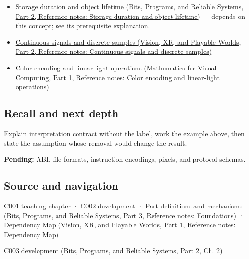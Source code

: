 \begin{itemize}
\item
  \href{../01-Bits-Programs-and-Reliable-Systems-P02/main.pdf\#appendix-0b104bcba06b}{Storage duration and object lifetime (Bits, Programs, and Reliable Systems, Part 2, Reference notes: Storage duration and object lifetime)} --- depends on this concept; see its prerequisite explanation.
\item
  \href{../07-Vision-XR-and-Playable-Worlds-P02/main.pdf\#appendix-1077ea8fc737}{Continuous signals and discrete samples (Vision, XR, and Playable Worlds, Part 2, Reference notes: Continuous signals and discrete samples)}
\item
  \href{../02-Mathematics-for-Visual-Computing-P01/main.pdf\#appendix-a9f83ad40792}{Color encoding and linear-light operations (Mathematics for Visual Computing, Part 1, Reference notes: Color encoding and linear-light operations)}
\end{itemize}

\subsection{Recall and next depth}\label{appendix-f414bd4ed05c-recall-and-next-depth}

\hypertarget{appendix-f414bd4ed05c-recall-and-next-depth}{}

Explain interpretation contract without the label, work the example above, then state the assumption whose removal would change the result.

\textbf{Pending:} ABI, file formats, instruction encodings, pixels, and protocol schemas.

\subsection{Source and navigation}\label{appendix-f414bd4ed05c-source-and-navigation}

\hypertarget{appendix-f414bd4ed05c-source-and-navigation}{}

\hyperref[01-foundations-i-ch001-from-a-signal-to-an-interpretation]{C001 teaching chapter} · \hyperref[01-foundations-i-ch001-arithmetic-becomes-a-policy]{C002 development} · \href{../01-Bits-Programs-and-Reliable-Systems-P03/main.pdf\#appendix-fd090d982a15}{Part definitions and mechanisms (Bits, Programs, and Reliable Systems, Part 3, Reference notes: Foundations)} · \href{../07-Vision-XR-and-Playable-Worlds-P01/main.pdf\#appendix-4ad47bdd269a}{Dependency Map (Vision, XR, and Playable Worlds, Part 1, Reference notes: Dependency Map)}

\href{../01-Bits-Programs-and-Reliable-Systems-P02/main.pdf\#01-foundations-i-ch002-where-the-bytes-live}{C003 development (Bits, Programs, and Reliable Systems, Part 2, Ch. 2)}
